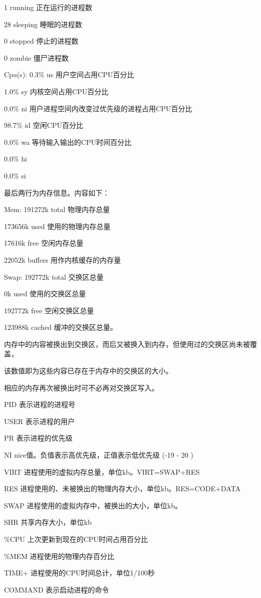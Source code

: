 \documentclass[letterpaper,10pt]{sphinxmanual}
\begin{document}
1 running 正在运行的进程数

28 sleeping 睡眠的进程数

0 stopped 停止的进程数

0 zombie 僵尸进程数

Cpu(s): 0.3\% us 用户空间占用CPU百分比

1.0\% sy 内核空间占用CPU百分比

0.0\% ni 用户进程空间内改变过优先级的进程占用CPU百分比

98.7\% id 空闲CPU百分比

0.0\% wa 等待输入输出的CPU时间百分比

0.0\% hi

0.0\% si

最后两行为内存信息。内容如下：

Mem: 191272k total 物理内存总量

173656k used 使用的物理内存总量

17616k free 空闲内存总量

22052k buffers 用作内核缓存的内存量

Swap: 192772k total 交换区总量

0k used 使用的交换区总量

192772k free 空闲交换区总量

123988k cached 缓冲的交换区总量。

内存中的内容被换出到交换区，而后又被换入到内存，但使用过的交换区尚未被覆盖，

该数值即为这些内容已存在于内存中的交换区的大小。

相应的内存再次被换出时可不必再对交换区写入。

PID 表示进程的进程号

USER 表示进程的用户

PR  表示进程的优先级

NI nice值。负值表示高优先级，正值表示低优先级 (-19 - 20 )

VIRT 进程使用的虚拟内存总量，单位kb。VIRT=SWAP+RES

RES 进程使用的、未被换出的物理内存大小，单位kb。RES=CODE+DATA

SWAP 进程使用的虚拟内存中，被换出的大小，单位kb。

SHR 共享内存大小，单位kb

\%CPU 上次更新到现在的CPU时间占用百分比

\%MEM 进程使用的物理内存百分比

TIME+ 进程使用的CPU时间总计，单位1/100秒

COMMAND 表示启动进程的命令
\end{document}
